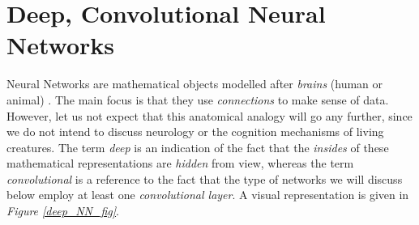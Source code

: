 \section{Deep, Convolutional Neural Networks}
Neural Networks are mathematical objects modelled after \textit{brains} (human or animal) \cite{Goodfellow-et-al-2016}. The main focus is that they use \textit{connections} to make sense of data. However, let us not expect that this anatomical analogy will go any further, since we do not intend to discuss neurology or the cognition mechanisms of living creatures. The term \textit{deep} is an indication of the fact that the \textit{insides} of these mathematical representations are \textit{hidden} from view, whereas the term \textit{convolutional} is a reference to the fact that the type of networks we will discuss below employ at least one \textit{convolutional layer}. A visual representation is given in \textit{ Figure \ref{deep_NN_fig}}.

